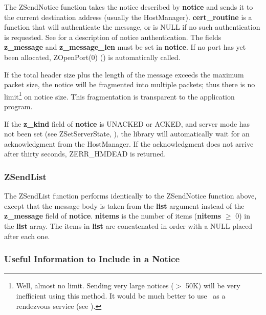 The ZSendNotice function takes the notice described by {\bf notice}
and sends it to the current destination address (usually the
HostManager).  {\bf cert_routine} is a function that will
authenticate the message, or is NULL if no such authentication is
requested.  See
 for a description of notice
authentication.  The fields {\bf z_message} and {\bf z_message_len}
must be set in {\bf notice}.  If no port has yet been allocated,
ZOpenPort(0) () is automatically called.

If the total header size plus the length of the message exceeds the
maximum packet size, the notice will be fragmented into multiple
packets; thus there is no limit\footnote{Well, almost no limit.
Sending very large notices ($>$ 50K) will be very inefficient using this
method.  It would be much better to use \Zephyr\ as a rendezvous
service (see ).} on notice size.  This
fragmentation is transparent to the application program.

If the {\bf z_kind} field of {\bf notice} is UNACKED or ACKED, and
server mode has not been set (see ZSetServerState,
), the library
will automatically wait for an acknowledgment from the HostManager.
If the acknowledgment does not arrive after thirty seconds,
ZERR_HMDEAD is returned.

\subsubsection{ZSendList}
\label{ZSendList}

\etemplate
{}

The ZSendList function performs identically to the ZSendNotice
function above, except that the message body is taken from the {\bf
list} argument instead of the {\bf z_message} field of {\bf notice}.  {\bf
nitems} is the number of items ({\bf nitems} $\geq$ 0) in the {\bf list}
array.  The items in {\bf list} are concatenated in order with a NULL
placed after each one.

\subsubsection{Useful Information to Include in a Notice}

